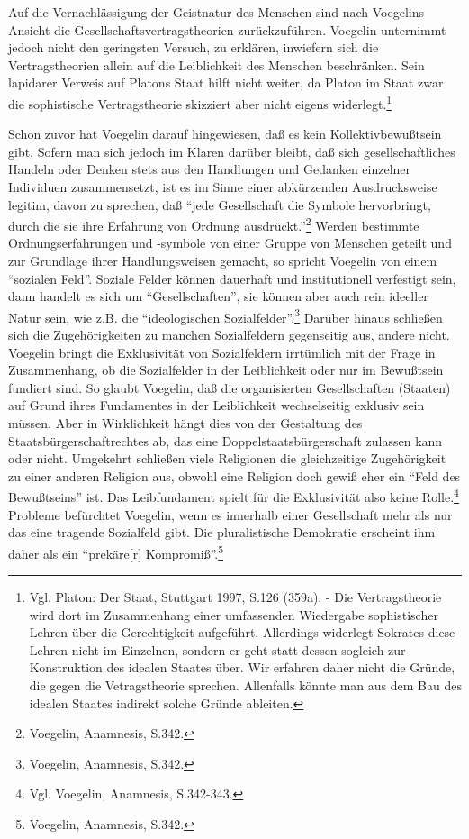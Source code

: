 Auf die Vernachlässigung der Geistnatur des Menschen sind nach Voegelins
Ansicht die Gesellschaftsvertragstheorien zurückzuführen. Voegelin unternimmt
jedoch nicht den geringsten Versuch, zu erklären, inwiefern sich die
Vertragstheorien allein auf die Leiblichkeit des Menschen beschränken. Sein
lapidarer Verweis auf Platons Staat hilft nicht weiter, da Platon im Staat
zwar die sophistische Vertragstheorie skizziert aber nicht eigens
widerlegt.\footnote{Vgl. Platon: Der Staat, Stuttgart 1997, S.126 (359a). -
  Die Vertragstheorie wird dort im Zusammenhang einer umfassenden Wiedergabe
  sophistischer Lehren über die Gerechtigkeit aufgeführt. Allerdings widerlegt
  Sokrates diese Lehren nicht im Einzelnen, sondern er geht statt dessen
  sogleich zur Konstruktion des idealen Staates über. Wir erfahren daher nicht
  die Gründe, die gegen die Vetragstheorie sprechen. Allenfalls könnte man aus
  dem Bau des idealen Staates indirekt solche Gründe ableiten.}

Schon zuvor hat Voegelin darauf hingewiesen, daß es kein Kollektivbewußtsein
gibt. Sofern man sich jedoch im Klaren darüber bleibt, daß sich
gesellschaftliches Handeln oder Denken stets aus den Handlungen und Gedanken
einzelner Individuen zusammensetzt, ist es im Sinne einer abkürzenden
Ausdrucksweise legitim, davon zu sprechen, daß "`jede Gesellschaft die Symbole
hervorbringt, durch die sie ihre Erfahrung von Ordnung
ausdrückt."'\footnote{Voegelin, Anamnesis, S.342.} Werden bestimmte
Ordnungserfahrungen und -symbole von einer Gruppe von Menschen geteilt und zur
Grundlage ihrer Handlungsweisen gemacht, so spricht Voegelin von einem
"`sozialen Feld"'. Soziale Felder können dauerhaft und institutionell
verfestigt sein, dann handelt es sich um "`Gesellschaften"', sie können aber
auch rein ideeller Natur sein, wie z.B. die "`ideologischen
Sozialfelder"'.\footnote{Voegelin, Anamnesis, S.342.} Darüber hinaus schließen
sich die Zugehörigkeiten zu manchen Sozialfeldern gegenseitig aus, andere
nicht. Voegelin bringt die Exklusivität von Sozialfeldern irrtümlich mit der
Frage in Zusammenhang, ob die Sozialfelder in der Leiblichkeit oder nur im
Bewußtsein fundiert sind. So glaubt Voegelin, daß die organisierten
Gesellschaften (Staaten) auf Grund ihres Fundamentes in der Leiblichkeit
wechselseitig exklusiv sein müssen. Aber in Wirklichkeit hängt dies von der
Gestaltung des Staatsbürgerschaftrechtes ab, das eine Doppelstaatsbürgerschaft
zulassen kann oder nicht. Umgekehrt schließen viele Religionen die
gleichzeitige Zugehörigkeit zu einer anderen Religion aus, obwohl eine
Religion doch gewiß eher ein "`Feld des Bewußtseins"' ist. Das Leibfundament
spielt für die Exklusivität also keine Rolle.\footnote{Vgl. Voegelin,
  Anamnesis, S.342-343.}  Probleme befürchtet Voegelin, wenn es innerhalb
einer Gesellschaft mehr als nur das eine tragende Sozialfeld gibt. Die
pluralistische Demokratie erscheint ihm daher als ein "`prekäre[r]
Kompromiß"'.\footnote{Voegelin, Anamnesis, S.342.}

